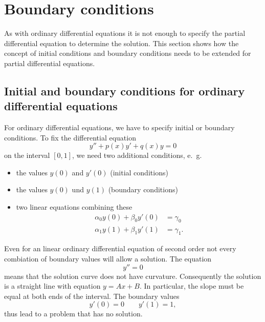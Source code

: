 %
%
%
\section{Boundary conditions\label{klassifikation:randbedingungen}}
As with ordinary differential equations it is not enough to 
specify the partial differential equation to determine the
solution.
This section shows how the concept of initial conditions and boundary
conditions needs to be extended for partial differential equations.

\subsection{Initial and boundary conditions for ordinary differential equations\label{klassifkation:anfangswerte-ode}}
For ordinary differential equations, we have to specify initial or boundary
conditions.
To fix the differential equation
\[
y''+p(x)y'+q(x)y=0
\]
on the interval
$[0,1]$,
we need two additional conditions, e.~g.
\begin{itemize}
\item the values $y(0)$ and $y'(0)$ (initial conditions)
\item the values $y(0)$ und $y(1)$ (boundary conditions)
\item two linear equations combining these
\begin{align*}
\alpha_0y(0)+\beta_0y'(0)&=\gamma_0\\
\alpha_1y(1)+\beta_1y'(1)&=\gamma_1.
\end{align*}
\end{itemize}

\begin{beispiel}
Even for an linear ordinary differential equation of second order
not every combiation of boundary values will allow a solution.
The equation
\[
y''=0
\]
means that the solution curve does not have curvature.
Consequently the solution is a straight line with equation $y=Ax+B$.
In particular, the slope must be equal at both ends of the interval.
The boundary values
\[
y'(0)=0\qquad y'(1)=1,
\]
thus lead to a problem that has no solution.
\end{beispiel}

